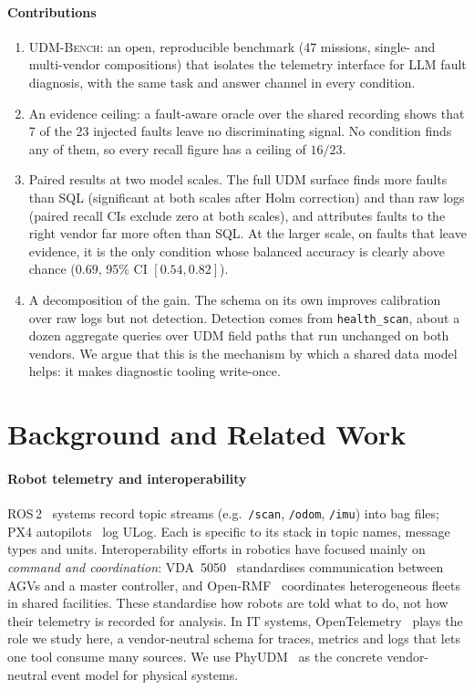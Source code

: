 \documentclass[conference]{IEEEtran}
\newcommand{\udm}{PhyUDM}
\newcommand{\hs}{\texttt{health\_scan}}
\begin{document}
\paragraph{Contributions}
\begin{enumerate}
  \item \textsc{UDM-Bench}: an open, reproducible benchmark (47 missions, single-
  and multi-vendor compositions) that isolates the telemetry interface for LLM
  fault diagnosis, with the same task and answer channel in every condition.
  \item An evidence ceiling: a fault-aware oracle over the shared recording shows
  that 7 of the 23 injected faults leave no discriminating signal. No condition
  finds any of them, so every recall figure has a ceiling of $16/23$.
  \item Paired results at two model scales. The full UDM surface finds more faults
  than SQL (significant at both scales after Holm correction) and than raw logs
  (paired recall CIs exclude zero at both scales), and attributes faults to the
  right vendor far more often than SQL. At the larger scale, on faults that leave
  evidence, it is the only condition whose balanced accuracy is clearly above
  chance ($0.69$, 95\% CI $[0.54, 0.82]$).
  \item A decomposition of the gain. The schema on its own improves calibration
  over raw logs but not detection. Detection comes from \hs{}, about a dozen
  aggregate queries over UDM field paths that run unchanged on both vendors. We
  argue that this is the mechanism by which a shared data model helps: it makes
  diagnostic tooling write-once.
\end{enumerate}

\section{Background and Related Work}

\paragraph{Robot telemetry and interoperability} ROS\,2~\cite{macenski2022ros2}
systems record topic streams (e.g.\ \texttt{/scan}, \texttt{/odom}, \texttt{/imu})
into bag files; PX4 autopilots~\cite{meier2015px4} log ULog. Each is specific to its
stack in topic names, message types and units. Interoperability efforts in robotics
have focused mainly on \emph{command and coordination}: VDA~5050~\cite{vda5050}
standardises communication between AGVs and a master controller, and
Open-RMF~\cite{openrmf} coordinates heterogeneous fleets in shared facilities.
These standardise how robots are told what to do, not how their telemetry is
recorded for analysis. In IT systems, OpenTelemetry~\cite{opentelemetry} plays the
role we study here, a vendor-neutral schema for traces, metrics and logs that lets
one tool consume many sources. We use \udm{}~\cite{phyudm} as the concrete
vendor-neutral event model for physical systems.
\end{document}
